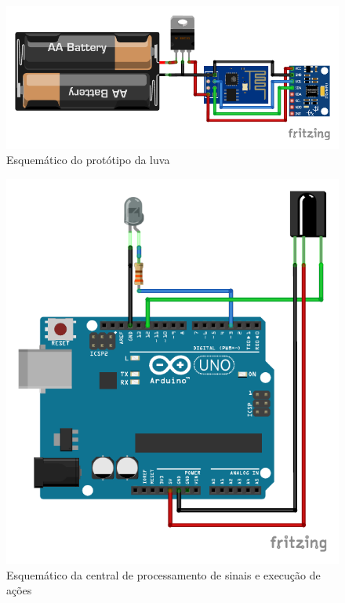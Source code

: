 \begin{figure}[ht]
    \centering
    \includegraphics{resources/esquematico_tcc_bb.pdf}
    \caption{Esquemático do protótipo da luva}
    \label{fig:my_label}
\end{figure}

\begin{figure}[ht]
    \centering
    \includegraphics{resources/esquematico_central_bb.pdf}
    \caption{Esquemático da central de processamento de sinais e execução de ações}
    \label{fig:esq_central}
\end{figure}

